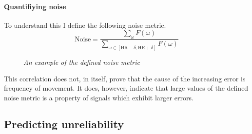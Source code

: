 \paragraph{Quantifiying noise}
To understand this I define the following noise metric.
\begin{equation*}
    \text{Noise} = \frac{\sum_{\omega} F(\omega)}{ \sum_{\omega \in [\text{HR}-\delta, \text{HR}+\delta ]}F(\omega)}  
\end{equation*}
\begin{figure}[H]
    \centering
    \subfloat[]{\scalebox{0.5}{}}%
    \subfloat[]{\scalebox{0.5}{ }}%
    \quad
    \subfloat[]{\scalebox{0.5}{ }}%
   \caption{\textit{An example of the defined noise metric} }
\end{figure}

\begin{figure}[H]
    \centering
    \subfloat[]{\scalebox{0.6}{}}
\end{figure}
This correlation does not, in itself, prove that the cause of the increasing error is frequency of movement.
It does, however, indicate that large values of the defined noise metric is a property of signals which exhibit larger errors.


\subsection{Predicting unreliability}


\begin{figure}[H]
    \centering
    \subfloat[]{\scalebox{0.6}{}}
\end{figure}

